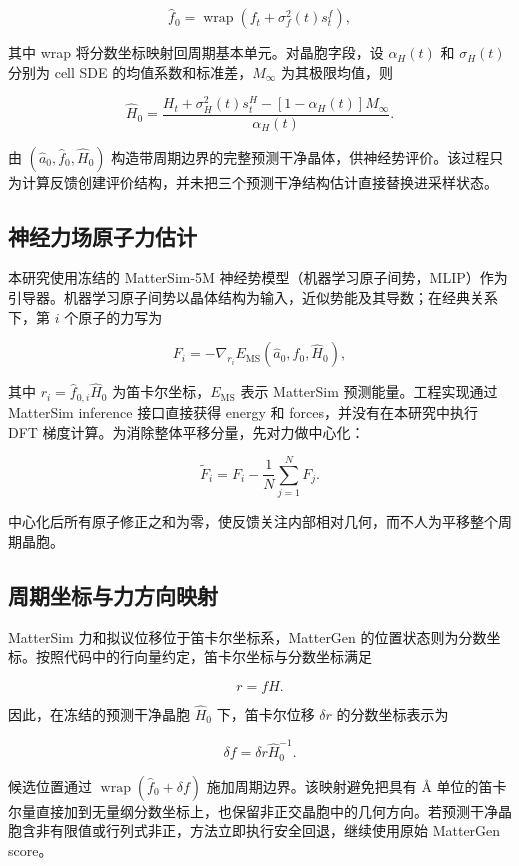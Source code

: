 \[
\widehat f_0=\operatorname{wrap}\!\left(f_t+\sigma_f^2(t)s_t^f\right),
\]

其中 wrap 将分数坐标映射回周期基本单元。对晶胞字段，设 \(\alpha_H(t)\) 和 \(\sigma_H(t)\) 分别为 cell SDE 的均值系数和标准差，\(M_\infty\) 为其极限均值，则

\[
\widehat H_0=
\frac{H_t+\sigma_H^2(t)s_t^H-[1-\alpha_H(t)]M_\infty}
{\alpha_H(t)}.
\]

由 \((\widehat a_0,\widehat f_0,\widehat H_0)\) 构造带周期边界的完整预测干净晶体，供神经势评价。该过程只为计算反馈创建评价结构，并未把三个预测干净结构估计直接替换进采样状态。

\subsection{神经力场原子力估计}

本研究使用冻结的 Matter\allowbreak Sim-5M 神经势模型（机器学习原子间势，MLIP）作为引导器。机器学习原子间势以晶体结构为输入，近似势能及其导数；在经典关系下，第 \(i\) 个原子的力写为

\[
F_i=-\nabla_{r_i}E_{\mathrm{MS}}(\widehat a_0,\widehat f_0,\widehat H_0),
\]

其中 \(r_i=\widehat f_{0,i}\widehat H_0\) 为笛卡尔坐标，\(E_{\mathrm{MS}}\) 表示 Matter\allowbreak Sim 预测能量\citep{yang2024mattersim}。工程实现通过 Matter\allowbreak Sim inference 接口直接获得 energy 和 forces，并没有在本研究中执行 DFT 梯度计算。为消除整体平移分量，先对力做中心化：

\[
\widetilde F_i=F_i-\frac{1}{N}\sum_{j=1}^{N}F_j.
\]

中心化后所有原子修正之和为零，使反馈关注内部相对几何，而不人为平移整个周期晶胞。

\subsection{周期坐标与力方向映射}

Matter\allowbreak Sim 力和拟议位移位于笛卡尔坐标系，MatterGen 的位置状态则为分数坐标。按照代码中的行向量约定，笛卡尔坐标与分数坐标满足

\[
r=fH.
\]

因此，在冻结的预测干净晶胞 \(\widehat H_0\) 下，笛卡尔位移 \(\delta r\) 的分数坐标表示为

\[
\delta f=\delta r\widehat H_0^{-1}.
\]

候选位置通过 \(\operatorname{wrap}(\widehat f_0+\delta f)\) 施加周期边界。该映射避免把具有 Å 单位的笛卡尔量直接加到无量纲分数坐标上，也保留非正交晶胞中的几何方向。若预测干净晶胞含非有限值或行列式非正，方法立即执行安全回退，继续使用原始 MatterGen score。

